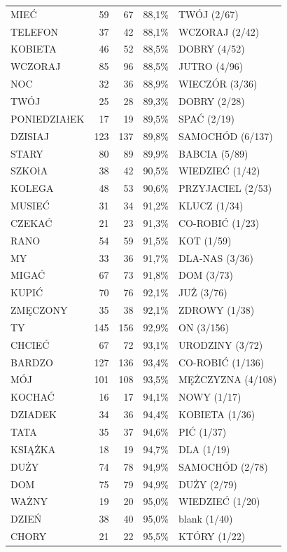 \documentclass[12pt]{article}
\begin{document}
\begin{longtable}{lrrrl}
MIEĆ & 59 & 67 & 88,1\% & TWÓJ (2/67) \\
TELEFON & 37 & 42 & 88,1\% & WCZORAJ (2/42) \\
KOBIETA & 46 & 52 & 88,5\% & DOBRY (4/52) \\
WCZORAJ & 85 & 96 & 88,5\% & JUTRO (4/96) \\
NOC & 32 & 36 & 88,9\% & WIECZÓR (3/36) \\
TWÓJ & 25 & 28 & 89,3\% & DOBRY (2/28) \\
PONIEDZIAłEK & 17 & 19 & 89,5\% & SPAĆ (2/19) \\
DZISIAJ & 123 & 137 & 89,8\% & SAMOCHÓD (6/137) \\
STARY & 80 & 89 & 89,9\% & BABCIA (5/89) \\
SZKOłA & 38 & 42 & 90,5\% & WIEDZIEĆ (1/42) \\
KOLEGA & 48 & 53 & 90,6\% & PRZYJACIEL (2/53) \\
MUSIEĆ & 31 & 34 & 91,2\% & KLUCZ (1/34) \\
CZEKAĆ & 21 & 23 & 91,3\% & CO-ROBIĆ (1/23) \\
RANO & 54 & 59 & 91,5\% & KOT (1/59) \\
MY & 33 & 36 & 91,7\% & DLA-NAS (3/36) \\
MIGAĆ & 67 & 73 & 91,8\% & DOM (3/73) \\
KUPIĆ & 70 & 76 & 92,1\% & JUŻ (3/76) \\
ZMĘCZONY & 35 & 38 & 92,1\% & ZDROWY (1/38) \\
TY & 145 & 156 & 92,9\% & ON (3/156) \\
CHCIEĆ & 67 & 72 & 93,1\% & URODZINY (3/72) \\
BARDZO & 127 & 136 & 93,4\% & CO-ROBIĆ (1/136) \\
MÓJ & 101 & 108 & 93,5\% & MĘŻCZYZNA (4/108) \\
KOCHAĆ & 16 & 17 & 94,1\% & NOWY (1/17) \\
DZIADEK & 34 & 36 & 94,4\% & KOBIETA (1/36) \\
TATA & 35 & 37 & 94,6\% & PIĆ (1/37) \\
KSIĄŻKA & 18 & 19 & 94,7\% & DLA (1/19) \\
DUŻY & 74 & 78 & 94,9\% & SAMOCHÓD (2/78) \\
DOM & 75 & 79 & 94,9\% & DUŻY (2/79) \\
WAŻNY & 19 & 20 & 95,0\% & WIEDZIEĆ (1/20) \\
DZIEŃ & 38 & 40 & 95,0\% & blank (1/40) \\
CHORY & 21 & 22 & 95,5\% & KTÓRY (1/22) \\

\end{longtable}
\end{document}
